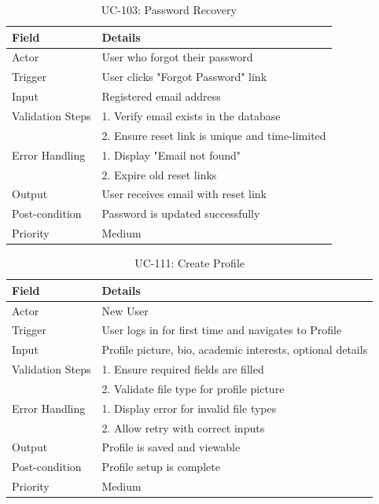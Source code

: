 \begin{table}[H]
\centering
\caption{UC-103: Password Recovery}
\begin{tabular}{|l|p{10cm}|}
\hline
\textbf{Field} & \textbf{Details} \\ \hline
Actor & User who forgot their password \\ \hline
Trigger & User clicks "Forgot Password" link \\ \hline
Input & Registered email address \\ \hline
Validation Steps & 1. Verify email exists in the database \\ 
                 & 2. Ensure reset link is unique and time-limited \\ \hline
Error Handling & 1. Display "Email not found" \\ 
               & 2. Expire old reset links \\ \hline
Output & User receives email with reset link \\ \hline
Post-condition & Password is updated successfully \\ \hline
Priority & Medium \\ \hline
\end{tabular}
\end{table}

\begin{table}[H]
\centering
\caption{UC-111: Create Profile}
\begin{tabular}{|l|p{10cm}|}
\hline
\textbf{Field} & \textbf{Details} \\ \hline
Actor & New User \\ \hline
Trigger & User logs in for first time and navigates to Profile \\ \hline
Input & Profile picture, bio, academic interests, optional details \\ \hline
Validation Steps & 1. Ensure required fields are filled \\ 
                 & 2. Validate file type for profile picture \\ \hline
Error Handling & 1. Display error for invalid file types \\ 
               & 2. Allow retry with correct inputs \\ \hline
Output & Profile is saved and viewable \\ \hline
Post-condition & Profile setup is complete \\ \hline
Priority & Medium \\ \hline
\end{tabular}
\end{table}

